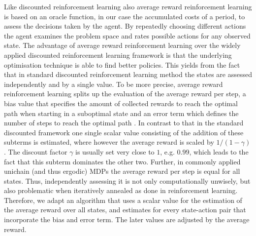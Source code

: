 \documentclass[envcountsame]{llncs}
\begin{document}
Like discounted reinforcement learning also average reward reinforcement learning is based on an
oracle function, in our case the accumulated costs of a period, to assess the decisions taken by the
agent. By repeatedly choosing different actions the agent examines the problem space and rates
possible actions for any observed state. The advantage of average reward reinforcement learning over
the widely applied discounted reinforcement learning framework is that the underlying optimisation
technique is able to find better policies. This yields from the fact that in standard discounted
reinforcement learning method the states are assessed independently and by a single value. To be
more precise, average reward reinforcement learning splits up the evaluation of the average reward
per step, a bias value that specifies the amount of collected rewards to reach the optimal path when
starting in a suboptimal state and an error term which defines the number of steps to reach the
optimal path \citep{Howard64,Puterman94,
  Mahadevan96_AverageRewardReinforcementLearningFoundationsAlgorithmsAndEmpiricalResults}. %
In contrast to that in the standard discounted framework one single scalar value consisting of the
addition of these subterms is estimated, where however the average reward is scaled by
\(1/(1-\gamma)\). The discount factor \(\gamma\) is usually set very close to \(1\), e.g. \(0.99\),
which leads to the fact that this subterm dominates the other two.
%
Further, in commonly applied unichain (and thus ergodic) MDPs the average reward per step is equal
for all states. Thus, independently assessing it is not only computationally unwisely, but also
problematic when iteratively annealed as done in reinforcement learning. Therefore, we adapt an
algorithm that uses a scalar value for the estimation of the average reward over all states, and
estimates for every state-action pair that incorporate the bias and error term. The later values are
adjusted by the average reward.
\end{document}
